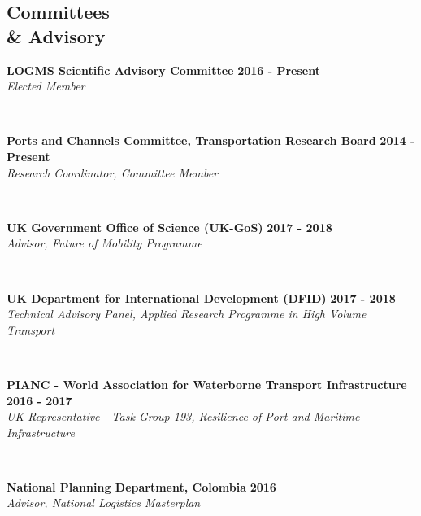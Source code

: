 \documentclass[margin]{res}
\newcommand\tab[1][1cm]{\hspace*{#1}}
\begin{document}
\begin{resume}
\section{\sc Committees\\ \&  Advisory}
\vspace{+0.1in}
	\begin{minipage}{\textwidth}
	{\bf LOGMS Scientific Advisory Committee} \hfill {\bf 2016 - Present} \\
	\tab[0.2in] \textit{Elected Member}
	\end{minipage}
	\vspace{0.02in}
	\\
	\begin{minipage}{\textwidth}
	{\bf Ports and Channels Committee, Transportation Research Board} \hfill {\bf 2014 - Present} \\
	\tab[0.2in] \textit{Research Coordinator, Committee Member}
	\end{minipage}
	\vspace{0.02in}
	\\
	\begin{minipage}{\textwidth}
	{\bf UK Government Office of Science (UK-GoS)} \hfill {\bf 2017 - 2018} \\
	\tab[0.2in] \textit{Advisor, Future of Mobility Programme}
	\end{minipage}
	\vspace{0.02in}
	\\
	\begin{minipage}{\textwidth}
	{\bf UK Department for International Development (DFID)} \hfill {\bf 2017 - 2018} \\
	\tab[0.2in] \textit{Technical Advisory Panel, Applied Research Programme in High Volume Transport}
	\end{minipage}
	\vspace{0.02in}
	\\
	\begin{minipage}{\textwidth}
	{\bf PIANC - World Association for Waterborne Transport Infrastructure} \hfill {\bf 2016 - 2017} \\
	\tab[0.2in] \textit{UK Representative - Task Group 193, Resilience of Port and Maritime Infrastructure}
	\end{minipage}
	\vspace{0.02in}
	\\
	\begin{minipage}{\textwidth}
	{\bf National Planning Department, Colombia} \hfill {\bf 2016} \\
	\tab[0.2in] \textit{Advisor, National Logistics Masterplan}
	\end{minipage}
	\vspace{0.02in}
	\\


\end{resume}
\end{document}
